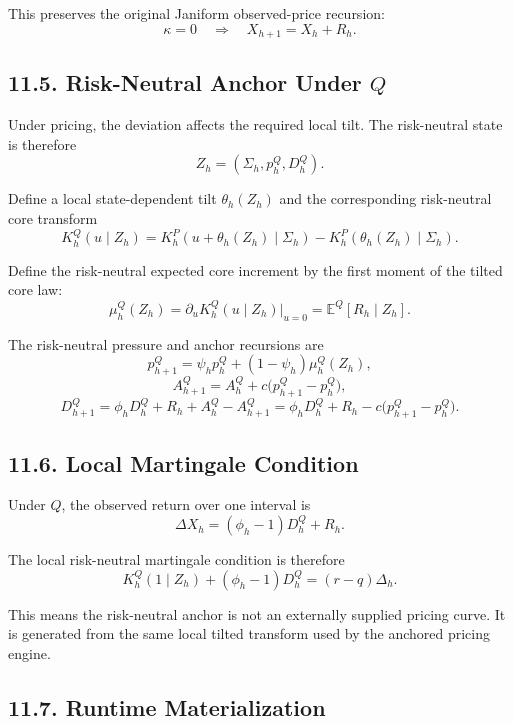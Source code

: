 \documentclass[11pt]{article}
\begin{document}
    This preserves the original Janiform observed-price recursion:
    \[
        \kappa = 0 \quad \Rightarrow \quad X_{h+1} = X_h + R_h.
    \]

    \subsection*{11.5. Risk-Neutral Anchor Under \(Q\)}

    Under pricing, the deviation affects the required local tilt. The
    risk-neutral state is therefore
    \[
        Z_h = (\Sigma_h, p_h^Q, D_h^Q).
    \]

    Define a local state-dependent tilt \(\theta_h(Z_h)\) and the corresponding
    risk-neutral core transform
    \[
        K_h^Q(u \mid Z_h)
        =
        K_h^P(u + \theta_h(Z_h) \mid \Sigma_h)
        -
        K_h^P(\theta_h(Z_h) \mid \Sigma_h).
    \]

    Define the risk-neutral expected core increment by the first moment of the tilted
    core law:
    \[
        \mu_h^Q(Z_h)
        =
        \partial_u K_h^Q(u \mid Z_h)\big|_{u=0}
        =
        \mathbb E^Q[R_h \mid Z_h].
    \]

    The risk-neutral pressure and anchor recursions are
    \[
        p_{h+1}^Q = \psi_h p_h^Q + (1-\psi_h)\mu_h^Q(Z_h),
    \]
    \[
        A_{h+1}^Q = A_h^Q + c\big(p_{h+1}^Q - p_h^Q\big),
    \]
    \[
        D_{h+1}^Q
        =
        \phi_h D_h^Q + R_h + A_h^Q - A_{h+1}^Q
        =
        \phi_h D_h^Q + R_h - c\big(p_{h+1}^Q - p_h^Q\big).
    \]

    \subsection*{11.6. Local Martingale Condition}

    Under \(Q\), the observed return over one interval is
    \[
        \Delta X_h
        =
        (\phi_h - 1) D_h^Q + R_h.
    \]

    The local risk-neutral martingale condition is therefore
    \[
        K_h^Q(1 \mid Z_h) + (\phi_h - 1) D_h^Q = (r-q)\Delta_h.
    \]

    This means the risk-neutral anchor is not an externally supplied pricing
    curve. It is generated from the same local tilted transform used by the
    anchored pricing engine.

    \subsection*{11.7. Runtime Materialization}
\end{document}

